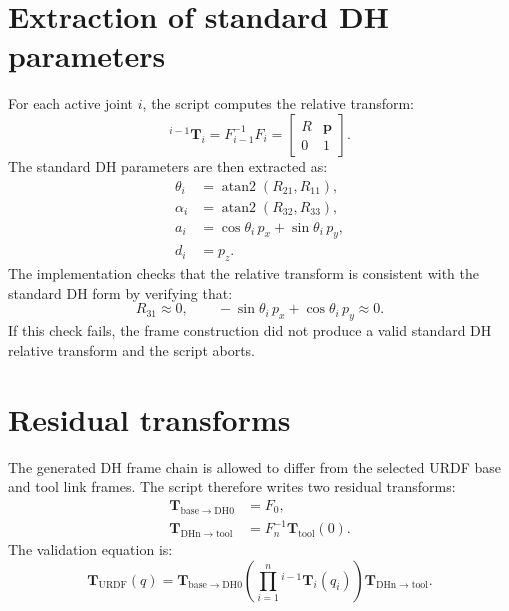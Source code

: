\documentclass[11pt,a4paper]{article}
\newcommand{\T}{\mathbf{T}}
\newcommand{\atan}{\operatorname{atan2}}
\begin{document}
\section{Extraction of standard DH parameters}

For each active joint $i$, the script computes the relative transform:
\begin{equation}
  {}^{i-1}\T_i = F_{i-1}^{-1}F_i =
  \begin{bmatrix}
    R & \bm{p} \\
    0 & 1
  \end{bmatrix}.
\end{equation}
The standard DH parameters are then extracted as:
\begin{align}
  \theta_i &= \atan(R_{21},R_{11}), \\
  \alpha_i &= \atan(R_{32},R_{33}), \\
  a_i &= \cos\theta_i\,p_x + \sin\theta_i\,p_y, \\
  d_i &= p_z.
\end{align}
The implementation checks that the relative transform is consistent with the standard DH form by verifying that:
\begin{equation}
  R_{31}\approx 0, \qquad -\sin\theta_i\,p_x+\cos\theta_i\,p_y\approx 0.
\end{equation}
If this check fails, the frame construction did not produce a valid standard DH relative transform and the script aborts.

\section{Residual transforms}

The generated DH frame chain is allowed to differ from the selected URDF base and tool link frames. The script therefore writes two residual transforms:
\begin{align}
  \T_{\mathrm{base}\rightarrow\mathrm{DH0}} &= F_0, \\
  \T_{\mathrm{DHn}\rightarrow\mathrm{tool}} &= F_n^{-1}\T_{\mathrm{tool}}(0).
\end{align}
The validation equation is:
\begin{equation}
  \T_{\mathrm{URDF}}(q) =
  \T_{\mathrm{base}\rightarrow\mathrm{DH0}}
  \left(\prod_{i=1}^{n} {}^{i-1}\T_i(q_i)\right)
  \T_{\mathrm{DHn}\rightarrow\mathrm{tool}}.
\end{equation}
\end{document}
